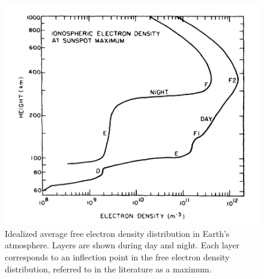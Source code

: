 \begin{figure}[htb]
\centering
\includegraphics[width=0.95\linewidth]{Ionosphere/figures/atmosphere_layers.jpg}
\caption{Idealized average free electron density distribution in Earth's atmosphere. Layers are shown during day and night. Each layer corresponds to an inflection point in the free electron density distribution, referred to in the literature as a maximum. }
\label{Fig:iono_layer}
\end{figure}




